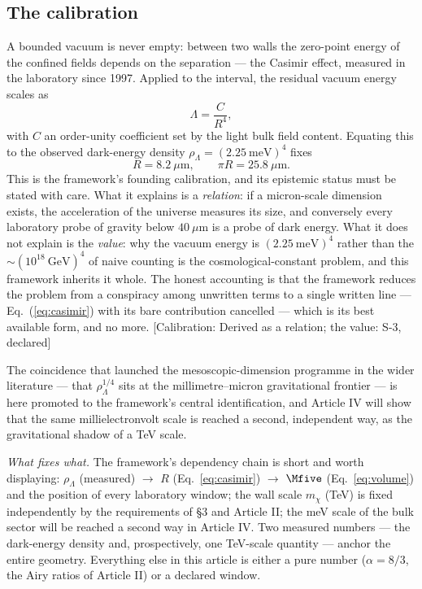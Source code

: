 \subsection{The calibration}
A bounded vacuum is never empty: between two walls the zero-point energy of the confined fields depends on the separation --- the Casimir effect, measured in the laboratory since 1997. Applied to the interval, the residual vacuum energy scales as
\begin{equation}
\Lambda=\frac{C}{R^{4}},
\label{eq:casimir}
\end{equation}
with $C$ an order-unity coefficient set by the light bulk field content. Equating this to the observed dark-energy density $\rho_{\Lambda}=(2.25~\mathrm{meV})^{4}$ fixes
\begin{equation}
R=8.2~\mu\mathrm{m},\qquad \pi R=25.8~\mu\mathrm{m}.
\end{equation}
This is the framework's founding calibration, and its epistemic status must be stated with care. What it explains is a \emph{relation}: if a micron-scale dimension exists, the acceleration of the universe measures its size, and conversely every laboratory probe of gravity below $40~\mu$m is a probe of dark energy. What it does not explain is the \emph{value}: why the vacuum energy is $(2.25~\mathrm{meV})^{4}$ rather than the $\sim(10^{18}~\mathrm{GeV})^{4}$ of naive counting is the cosmological-constant problem, and this framework inherits it whole. The honest accounting is that the framework reduces the problem from a conspiracy among unwritten terms to a single written line --- Eq.~(\ref{eq:casimir}) with its bare contribution cancelled --- which is its best available form, and no more. [Calibration: Derived as a relation; the value: S-3, declared]

The coincidence that launched the mesoscopic-dimension programme in the wider literature --- that $\rho_{\Lambda}^{1/4}$ sits at the millimetre--micron gravitational frontier --- is here promoted to the framework's central identification, and Article IV will show that the same millielectronvolt scale is reached a second, independent way, as the gravitational shadow of a TeV scale.

\emph{What fixes what.} The framework's dependency chain is short and worth displaying: $\rho_{\Lambda}$ (measured) $\to$ $R$ (Eq.~\ref{eq:casimir}) $\to$ $\Mfive$ (Eq.~\ref{eq:volume}) and the position of every laboratory window; the wall scale $m_\chi$ (TeV) is fixed independently by the requirements of \S3 and Article II; the meV scale of the bulk sector will be reached a second way in Article IV. Two measured numbers --- the dark-energy density and, prospectively, one TeV-scale quantity --- anchor the entire geometry. Everything else in this article is either a pure number ($\alpha=8/3$, the Airy ratios of Article II) or a declared window.

